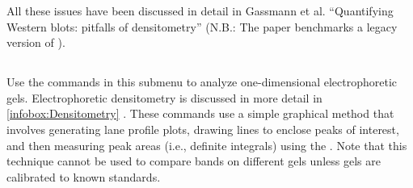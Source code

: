 \begin{infobox}[H]
All these issues have been discussed in detail in Gassmann et al.
``Quantifying Western blots: pitfalls of densitometry'' \cite{Gassmann:2009p20997}
(N.B.: The paper benchmarks a legacy version of ).
\end{infobox}



\subsection[\protect\userinterface{Gels\lyxarrow{}}]{\protect{}\label{sub:Gels}\improvement{}}

Use the commands in this submenu to analyze one-dimensional electrophoretic
gels. Electrophoretic densitometry is discussed in more detail in
\ref{infobox:Densitometry} . These
commands use a simple graphical method that involves generating lane
profile plots, drawing lines to enclose peaks of interest, and then
measuring peak areas (i.e., definite
integrals) using the . Note that this technique
cannot be used to compare bands on different gels unless gels are
calibrated to known standards.
\begin{figure}[h]
\noindent {}
\end{figure}

